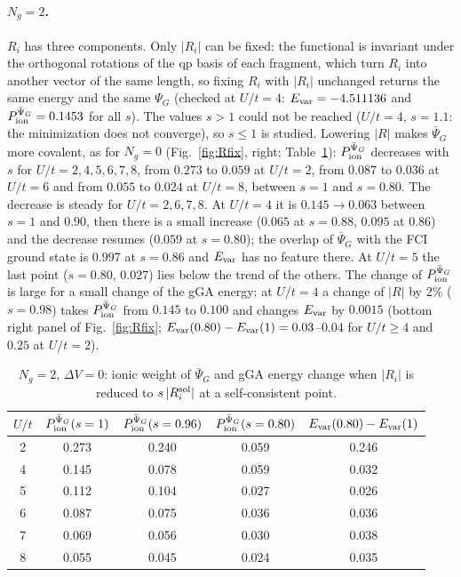 \documentclass[11pt]{article}
\newcommand{\Ng}{N_{g}}
\newcommand{\dV}{\Delta V}
\begin{document}
\paragraph{$\Ng=2$.} $R_i$ has three components. Only $|R_i|$ can be fixed: the functional is invariant under the orthogonal rotations of the qp basis of each fragment, which turn $R_i$ into another vector of the same length, so fixing $R_i$ with $|R_i|$ unchanged returns the same energy and the same $\Psi_G$ (checked at $U/t=4$: $E_{\rm var}=-4.511136$ and $P_{\rm ion}^{\bar\Psi_G}=0.1453$ for all $s$). The values $s>1$ could not be reached ($U/t=4$, $s=1.1$: the minimization does not converge), so $s\le1$ is studied.
Lowering $|R|$ makes $\bar\Psi_G$ more covalent, as for $\Ng=0$ (Fig.~\ref{fig:Rfix}, right; Table~\ref{tab:Rfix}): $P_{\rm ion}^{\bar\Psi_G}$ decreases with $s$ for $U/t=2,4,5,6,7,8$, from $0.273$ to $0.059$ at $U/t=2$, from $0.087$ to $0.036$ at $U/t=6$ and from $0.055$ to $0.024$ at $U/t=8$, between $s=1$ and $s=0.80$. The decrease is steady for $U/t=2,6,7,8$. At $U/t=4$ it is $0.145\to0.063$ between $s=1$ and $0.90$, then there is a small increase ($0.065$ at $s=0.88$, $0.095$ at $0.86$) and the decrease resumes ($0.059$ at $s=0.80$); the overlap of $\bar\Psi_G$ with the FCI ground state is $0.997$ at $s=0.86$ and $E_{\rm var}$ has no feature there. At $U/t=5$ the last point ($s=0.80$, $0.027$) lies below the trend of the others.
The change of $P_{\rm ion}^{\bar\Psi_G}$ is large for a small change of the gGA energy: at $U/t=4$ a change of $|R|$ by $2\%$ ($s=0.98$) takes $P_{\rm ion}^{\bar\Psi_G}$ from $0.145$ to $0.100$ and changes $E_{\rm var}$ by $0.0015$ (bottom right panel of Fig.~\ref{fig:Rfix}; $E_{\rm var}(0.80)-E_{\rm var}(1)=0.03$--$0.04$ for $U/t\ge4$ and $0.25$ at $U/t=2$).
\begin{table}[H]
\centering\small
\begin{tabular}{c|ccc|c}
$U/t$ & $P_{\rm ion}^{\bar\Psi_G}(s=1)$ & $P_{\rm ion}^{\bar\Psi_G}(s=0.96)$ & $P_{\rm ion}^{\bar\Psi_G}(s=0.80)$ & $E_{\rm var}(0.80)-E_{\rm var}(1)$\\\hline
2 & 0.273 & 0.240 & 0.059 & 0.246\\
4 & 0.145 & 0.078 & 0.059 & 0.032\\
5 & 0.112 & 0.104 & 0.027 & 0.026\\
6 & 0.087 & 0.075 & 0.036 & 0.036\\
7 & 0.069 & 0.056 & 0.030 & 0.038\\
8 & 0.055 & 0.045 & 0.024 & 0.035
\end{tabular}
\caption{$\Ng=2$, $\dV=0$: ionic weight of $\bar\Psi_G$ and gGA energy change when $|R_i|$ is reduced to $s\,|R_i^{\rm sol}|$ at a self-consistent point.}
\label{tab:Rfix}
\end{table}
\end{document}
